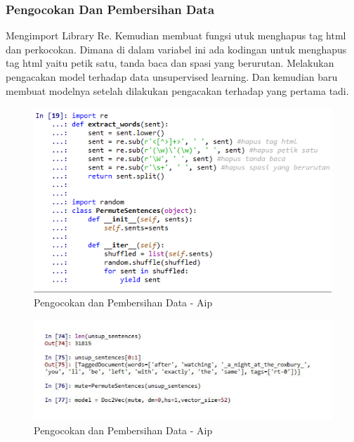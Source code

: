 \subsubsection{Pengocokan Dan Pembersihan Data}
Mengimport Library Re. Kemudian membuat fungsi utuk menghapus tag html dan perkocokan. Dimana di dalam variabel ini ada kodingan untuk menghapus tag html yaitu petik satu, tanda baca dan spasi yang berurutan. Melakukan pengacakan model terhadap data unsupervised learning. Dan kemudian baru membuat modelnya setelah dilakukan pengacakan terhadap yang pertama tadi.
\begin{figure}[!hbtp]
\centering
\includegraphics[scale=0.3]{figures/AIP/e22.PNG}
\caption{Pengocokan dan Pembersihan Data - Aip}
\label{Pengocokan dan Pembersihan Data - Aip}
\end{figure}

\begin{figure}[!hbtp]
\centering
\includegraphics[scale=0.3]{figures/AIP/e23.PNG}
\caption{Pengocokan dan Pembersihan Data - Aip}
\label{Pengocokan dan Pembersihan Data - Aip}
\end{figure}


